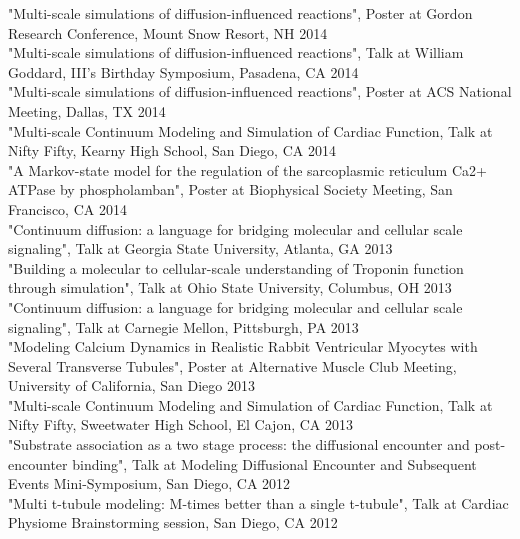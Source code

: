 \documentclass{res} %
\begin{document}
\begin{resume}
"Multi-scale simulations of diffusion-influenced reactions", Poster at Gordon Research Conference, Mount Snow Resort, NH \hfill 2014 \\

"Multi-scale simulations of diffusion-influenced reactions", Talk at William Goddard, III's Birthday Symposium, Pasadena, CA \hfill 2014 \\

"Multi-scale simulations of diffusion-influenced reactions", Poster at ACS National Meeting, Dallas, TX \hfill 2014 \\

"Multi-scale Continuum Modeling and Simulation of Cardiac Function, Talk at Nifty Fifty, Kearny High School, San Diego, CA \hfill 2014 \\

"A Markov-state model for the regulation of the sarcoplasmic reticulum Ca2+ ATPase by phospholamban",  Poster at Biophysical Society Meeting, San Francisco, CA \hfill 2014 \\

"Continuum diffusion: a language for bridging  molecular and cellular scale signaling", Talk at Georgia State University, Atlanta, GA \hfill 2013 \\

"Building a molecular to cellular-scale understanding of Troponin function through simulation", Talk at Ohio State University, Columbus, OH \hfill 2013 \\

"Continuum diffusion: a language for bridging  molecular and cellular scale signaling", Talk at Carnegie Mellon, Pittsburgh, PA \hfill 2013 \\

"Modeling Calcium Dynamics in Realistic Rabbit Ventricular Myocytes with Several Transverse Tubules", Poster at Alternative Muscle Club Meeting, University of California, San Diego  \hfill 2013 \\

"Multi-scale Continuum Modeling and Simulation of Cardiac Function, Talk at Nifty Fifty, Sweetwater High School, El Cajon, CA \hfill 2013 \\

"Substrate association as a two stage process: the diffusional encounter and post-encounter binding", Talk at Modeling Diffusional Encounter and Subsequent Events Mini-Symposium, San Diego, CA  \hfill 2012 \\

"Multi t-tubule modeling: M-times better than a single t-tubule", Talk at Cardiac Physiome Brainstorming session, San Diego, CA  \hfill 2012 \\


\end{resume}
\end{document}

